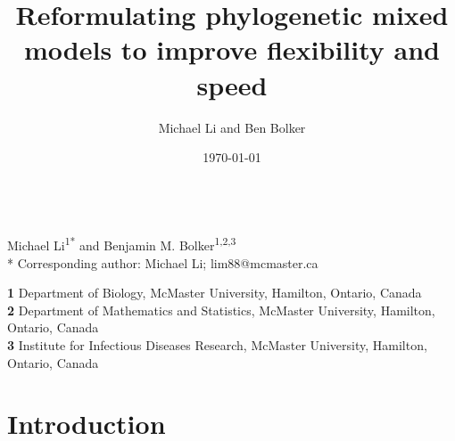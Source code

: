 \documentclass[12pt]{article}
\title{Reformulating phylogenetic mixed models to improve flexibility and speed}
\author{Michael Li and Ben Bolker}
\date{\today}
\date{}
\begin{document}
\newcommand{\dbic}{\ensuremath \Delta \textrm{BIC}}

\newcommand{\bmbhide}[1]{}
\newcommand{\bmb}[1]{{\color{blue} BB: #1}}


\renewcommand{\figurename}{Fig.}

\newcommand{\mli}[1]{{\color{red} ML: #1}}

\newcommand{\add}[1]{{\color{blue} ADD: #1}}


\newcommand{\pkg}[1]{{\tt #1}}
\newcommand{\code}[1]{{\tt #1}}


\linenumbers





\begin{center}
{\Large
\textbf{} %
}
\\
\vspace{2pt}
Michael Li\textsuperscript{1*} and Benjamin M. Bolker\textsuperscript{1,2,3}
\\
\vspace{2pt}
* Corresponding author: Michael Li; lim88@mcmaster.ca
\end{center}
\vspace{5pt}
\textbf{1} Department of Biology, McMaster University, Hamilton, Ontario, Canada
\\
\textbf{2} Department of Mathematics and Statistics, McMaster University, Hamilton, Ontario, Canada
\\
\textbf{3} Institute for Infectious Diseases Research, McMaster University, Hamilton, Ontario, Canada
\\
\bigskip

\doublespacing

%

\section*{Introduction}
\end{document}
